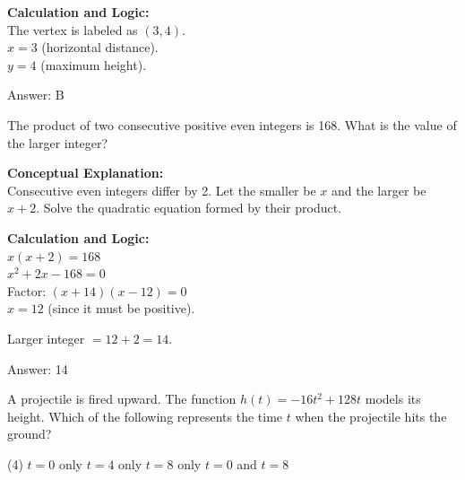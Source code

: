 \documentclass[11pt,paper=a4,answers]{exam}
\begin{document}
\begin{questions}
\begin{solution}
\vspace{20pt}

\textbf{Calculation and Logic:} \\
The vertex is labeled as $(3, 4)$. \\
$x = 3$ (horizontal distance). \\
$y = 4$ (maximum height).

\vspace{25pt}

Answer: \colorbox{yellow!100}{B}
\end{solution}

\vspace{40pt}

\question
The product of two consecutive positive even integers is 168. What is the value of the larger integer?

\begin{solution}
\textbf{Conceptual Explanation:} \\
Consecutive even integers differ by 2. Let the smaller be $x$ and the larger be $x+2$. Solve the quadratic equation formed by their product.

\vspace{20pt}

\textbf{Calculation and Logic:} \\
$x(x+2) = 168$ \\
$x^2 + 2x - 168 = 0$ \\
Factor: $(x+14)(x-12) = 0$ \\
$x = 12$ (since it must be positive).

\vspace{10pt}

Larger integer $= 12 + 2 = 14$.

\vspace{25pt}

Answer: \colorbox{yellow!100}{14}
\end{solution}

\vspace{40pt}

\question
A projectile is fired upward. The function $h(t) = -16t^2 + 128t$ models its height. Which of the following represents the time $t$ when the projectile hits the ground?
\begin{tasks}(4)
    \task $t = 0$ only
    \task $t = 4$ only
    \task $t = 8$ only
    \task $t = 0$ and $t = 8$
\end{tasks}


\end{questions}
\end{document}
